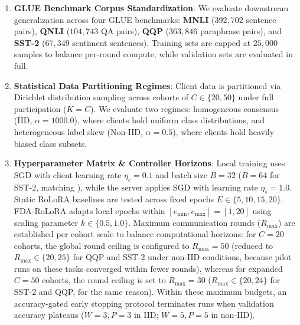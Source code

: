 \begin{enumerate}
    \item \textbf{GLUE Benchmark Corpus Standardization}\label{sec:eval_corpus}: 
    We evaluate downstream generalization across four GLUE benchmarks: \textbf{MNLI} ($392{,}702$ sentence pairs), \textbf{QNLI} ($104{,}743$ QA pairs), \textbf{QQP} ($363{,}846$ paraphrase pairs), and \textbf{SST-2} ($67{,}349$ sentiment sentences). Training sets are capped at $25{,}000$ samples to balance per-round compute, while validation sets are evaluated in full.

    \item \textbf{Statistical Data Partitioning Regimes}\label{sec:eval_regimes}: 
    Client data is partitioned via Dirichlet distribution sampling across cohorts of $C \in \{20, 50\}$ under full participation ($K = C$). We evaluate two regimes: homogeneous consensus (IID, $\alpha = 1000.0$), where clients hold uniform class distributions, and heterogeneous label skew (Non-IID, $\alpha = 0.5$), where clients hold heavily biased class subsets.

    \item \textbf{Hyperparameter Matrix \& Controller Horizons}\label{sec:eval_hyperparameters}: 
    Local training uses SGD with client learning rate $\eta_c = 0.1$ and batch size $B = 32$ ($B = 64$ for SST-2, matching \cite{chen2025robust}), while the server applies SGD with learning rate $\eta_s = 1.0$. Static RoLoRA baselines are tested across fixed epochs $E \in \{5, 10, 15, 20\}$. FDA-RoLoRA adapts local epochs within $[e_{\min}, e_{\max}] = [1, 20]$ using scaling parameter $k \in \{0.5, 1.0\}$. Maximum communication rounds ($R_{\max}$) are established per cohort scale to balance computational horizons: for $C = 20$ cohorts, the global round ceiling is configured to $R_{\max} = 50$ (reduced to $R_{\max} \in \{20, 25\}$ for QQP and SST-2 under non-IID conditions, because pilot runs on these tasks converged within fewer rounds), whereas for expanded $C = 50$ cohorts, the round ceiling is set to $R_{\max} = 30$ ($R_{\max} \in \{20, 24\}$ for SST-2 and QQP, for the same reason). Within these maximum budgets, an accuracy-gated early stopping protocol \label{sec:eval_early_stopping} terminates runs when validation accuracy plateaus ($W=3, P=3$ in IID; $W=5, P=5$ in non-IID).


\end{enumerate}
